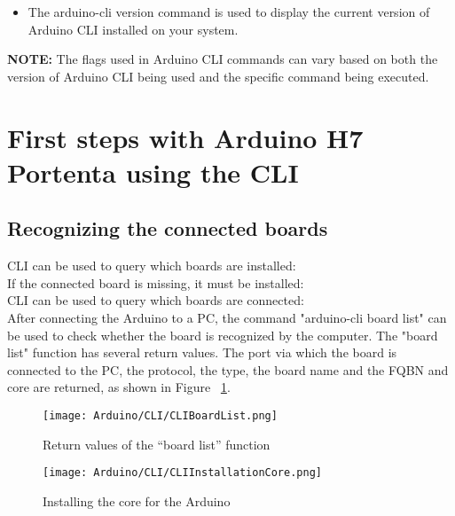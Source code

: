 \begin{itemize}
    
    \item {}
    
    The arduino-cli version command is used to display the current version of Arduino CLI installed on your system.
    
    
\end{itemize}

\textbf{NOTE:} The flags used in Arduino CLI commands can vary based on both the version of Arduino CLI being used and the specific command being executed.

\section{First steps with Arduino H7 Portenta using the CLI}

\subsection{Recognizing the connected boards}

CLI can be used to query which boards are installed:
\\
If the connected board is missing, it must be installed:
\\
CLI can be used to query which boards are connected:
\\
After connecting the Arduino to a PC, the command "arduino-cli board list" can be 
used to check whether the board is recognized by the computer. The "board 
list" function has several return values. The port via which the board is connected to 
the PC, the protocol, the type, the board name and the FQBN and core are returned, 
as shown in Figure ~\ref{CLIBoardList}. 
\begin{figure}
    \begin{center}
        \texttt{[image: Arduino/CLI/CLIBoardList.png]}
        \caption{ Return values of the “board list” function }
        \label{CLIBoardList}
    \end{center}
\end{figure}

\begin{figure}
    \begin{center}
        \texttt{[image: Arduino/CLI/CLIInstallationCore.png]}
        \caption{ Installing the core for the Arduino }
        \label{InstallationCore}
    \end{center}
\end{figure}

